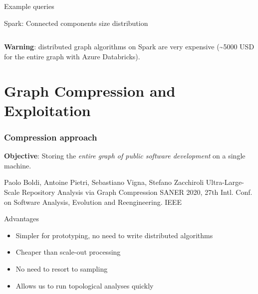 \documentclass[aspectratio=169,xcolor=table]{beamer}
\begin{document}
    \begin{frame}[fragile]{Example queries}
        \begin{block}{Spark: Connected components size distribution}
            \inputminted[fontsize=\small]{sql}{../codesamples/graph-dataset/spark-cc.py}
        \end{block}

        \begin{block}{}
            \textbf{Warning}: distributed graph algorithms on Spark are very
            expensive (\textasciitilde{}5000 USD for the entire graph with
            Azure Databricks).
        \end{block}
    \end{frame}

    \section{Graph Compression and Exploitation}

    \begin{frame}
        \frametitle{Compression approach}

        \begin{block}{}
            \textbf{Objective}: Storing the \emph{entire graph of public
            software development} on a single machine.

            \footnotesize
            \begin{thebibliography}{swhgraphcomp}
                 Paolo Boldi, Antoine Pietri, Sebastiano Vigna, Stefano Zacchiroli
                \newblock Ultra-Large-Scale Repository Analysis via Graph Compression
                \newblock SANER 2020, 27th Intl. Conf. on Software Analysis, Evolution and Reengineering. IEEE
            \end{thebibliography}
        \end{block}

        \begin{block}{Advantages}
            \begin{itemize}
                \item Simpler for prototyping, no need to write distributed
                    algorithms
                \item Cheaper than scale-out processing
                \item No need to resort to sampling
                \item Allows us to run topological analyses quickly
            \end{itemize}
        \end{block}
    \end{frame}
\end{document}
